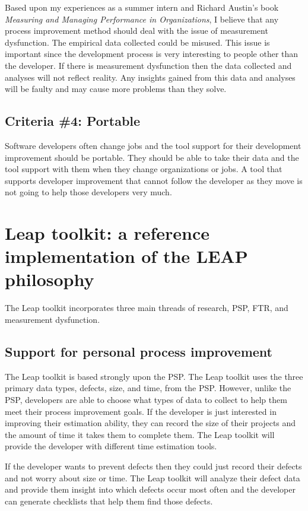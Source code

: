 Based upon my experiences as a summer intern and Richard Austin's book {\em
Measuring and Managing Performance in Organizations}\cite{Austin96}, I believe 
that any process improvement method should deal with the issue of measurement
dysfunction. The empirical data collected could be misused.  This issue is
important since the development process is very interesting to people other
than the developer.  If there is measurement dysfunction then the data
collected and analyses will not reflect reality.  Any insights gained from this 
data and analyses will be faulty and may cause more problems than they solve.


\subsection{Criteria \#4: Portable}

Software developers often change jobs and the tool support for their
development improvement should be portable.  They should be able to take their
data and the tool support with them when they change organizations or jobs. A
tool that supports developer improvement that cannot follow the developer as
they move is not going to help those developers very much.

\section{Leap toolkit: a reference implementation of the LEAP philosophy}

The Leap toolkit incorporates three main threads of research, PSP, FTR, and
measurement dysfunction.  

\subsection{Support for personal process improvement}

The Leap toolkit is based strongly upon the PSP. The Leap toolkit uses the
three primary data types, defects, size, and time, from the PSP.  However,
unlike the PSP, developers are able to choose what types of data to collect to
help them meet their process improvement goals.  If the developer is just
interested in improving their estimation ability, they can record the size of
their projects and the amount of time it takes them to complete them.  The Leap
toolkit will provide the developer with different time estimation tools.

If the developer wants to prevent defects then they could just record their
defects and not worry about size or time.  The Leap toolkit will analyze their
defect data and provide them insight into which defects occur most often and
the developer can generate checklists that help them find those defects.  

